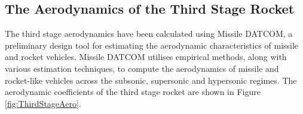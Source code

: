 		
		

		\subsection{The Aerodynamics of the Third Stage Rocket}\label{sec:thirdstageaero}
		
		The third stage aerodynamics have been calculated using Missile DATCOM\cite{Rosema2011}, a preliminary design tool for estimating the aerodynamic characteristics of missile and rocket vehicles. Missile DATCOM utilises empirical methods, along with various estimation techniques, to compute the aerodynamics of missile and rocket-like vehicles across the subsonic, supersonic and hypersonic regimes. The aerodynamic coefficients of the third stage rocket are shown in Figure \ref{fig:ThirdStageAero}. 
		
